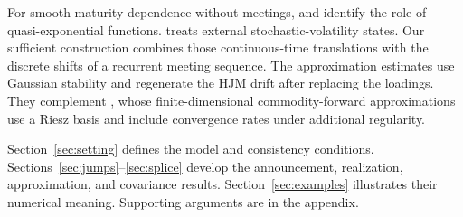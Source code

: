 For smooth maturity dependence without meetings, \citet[Proposition 5.1 and Corollary 5.1]{bjork2001existence} and \citet[Corollary 8.1]{tappe2010alternative} identify the role of quasi-exponential functions. \citet{bjork2004finite} treats external stochastic-volatility states. Our sufficient construction combines those continuous-time translations with the discrete shifts of a recurrent meeting sequence. The approximation estimates use Gaussian stability and regenerate the HJM drift after replacing the loadings. They complement \citet{benth2018approximation}, whose finite-dimensional commodity-forward approximations use a Riesz basis and include convergence rates under additional regularity.

Section~\ref{sec:setting} defines the model and consistency conditions. Sections~\ref{sec:jumps}--\ref{sec:splice} develop the announcement, realization, approximation, and covariance results. Section~\ref{sec:examples} illustrates their numerical meaning. Supporting arguments are in the appendix.
